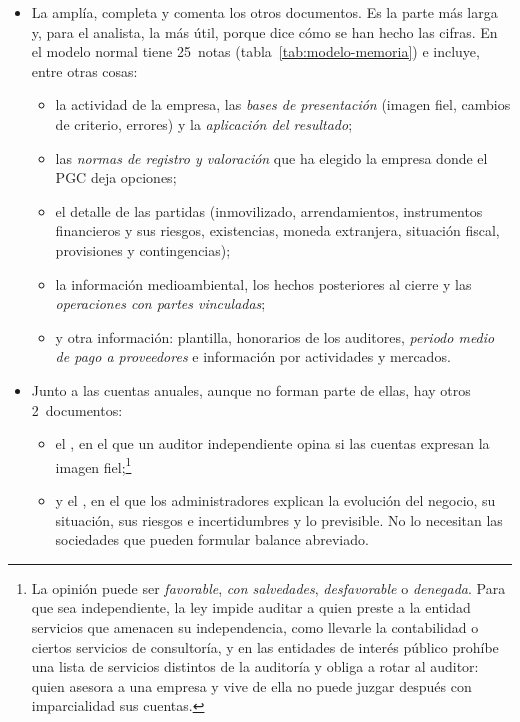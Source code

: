 \documentclass[11pt]{article}
\begin{document}
\begin{itemize}
\item La  amplía, completa y comenta los otros documentos. Es la parte más larga y, para el analista, la más útil, porque dice cómo se han hecho las cifras. En el modelo normal tiene 25~notas (tabla~\ref{tab:modelo-memoria}) e incluye, entre otras cosas\nocite{BOE2007PGC}:
  \begin{itemize}
  \item la actividad de la empresa, las \emph{bases de presentación} (imagen fiel, cambios de criterio, errores) y la \emph{aplicación del resultado};
  \item las \emph{normas de registro y valoración} que ha elegido la empresa donde el PGC deja opciones;
  \item el detalle de las partidas (inmovilizado, arrendamientos, instrumentos financieros y sus riesgos, existencias, moneda extranjera, situación fiscal, provisiones y contingencias);
  \item la información medioambiental, los hechos posteriores al cierre y las \emph{operaciones con partes vinculadas};
  \item y otra información: plantilla, honorarios de los auditores, \emph{periodo medio de pago a proveedores} e información por actividades y mercados.
  \end{itemize}
\item Junto a las cuentas anuales, aunque no forman parte de ellas, hay otros 2~documentos:
  \begin{itemize}
  \item el , en el que un auditor independiente opina si las cuentas expresan la imagen fiel;\footnote{La opinión puede ser \emph{favorable}, \emph{con salvedades}, \emph{desfavorable} o \emph{denegada}\nocite{BOE2015Ley22}. Para que sea independiente, la ley impide auditar a quien preste a la entidad servicios que amenacen su independencia, como llevarle la contabilidad o ciertos servicios de consultoría, y en las entidades de interés público prohíbe una lista de servicios distintos de la auditoría y obliga a rotar al auditor\nocite{UE2014Reglamento537}: quien asesora a una empresa y vive de ella no puede juzgar después con imparcialidad sus cuentas.}
  \item y el , en el que los administradores explican la evolución del negocio, su situación, sus riesgos e incertidumbres y lo previsible. No lo necesitan las sociedades que pueden formular balance abreviado\nocite{LSC2010}.

\end{itemize}
\end{itemize}
\end{document}
